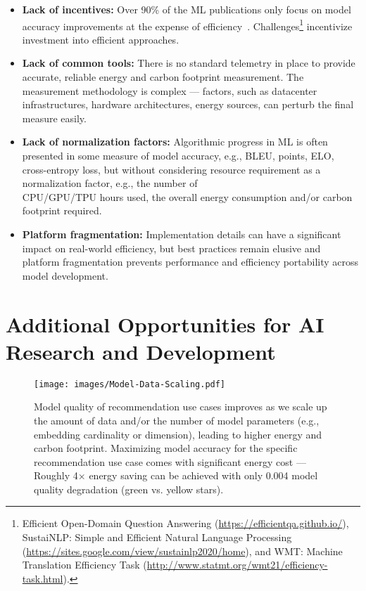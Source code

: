 \documentclass{IEEEtran}
\begin{document}
\begin{itemize}

\setlength\itemsep{0em}
    \item {\bf Lack of incentives:} Over 90\% of the ML publications only focus on model accuracy improvements at the expense of efficiency~\cite{Schwartz:arxiv:2019}. Challenges\footnote{Efficient Open-Domain Question Answering (\url{https://efficientqa.github.io/}), SustaiNLP: Simple and Efficient Natural Language Processing  (\url{https://sites.google.com/view/sustainlp2020/home}), and WMT: Machine Translation Efficiency Task (\url{http://www.statmt.org/wmt21/efficiency-task.html}).} incentivize investment into efficient approaches.
    \item {\bf Lack of common tools:} There is no standard telemetry in place to provide accurate, reliable energy and carbon footprint measurement. The measurement methodology is complex --- factors, such as datacenter infrastructures, hardware architectures, energy sources, can perturb the final measure easily.
    \item {\bf Lack of normalization factors:} Algorithmic progress in ML is often presented in some measure of model accuracy, e.g., BLEU, points, ELO, cross-entropy loss, but without considering resource requirement as a normalization factor, e.g., the number of \\CPU/GPU/TPU hours used, the overall energy consumption and/or carbon footprint required.   
    \item {\bf Platform fragmentation:} Implementation details can have a significant impact on real-world efficiency, but best practices remain elusive and platform fragmentation prevents performance and efficiency portability across model development.

\end{itemize}



\section{Additional Opportunities for AI Research and Development}
\label{sec:additional-opportunities}
\vspace{0.4cm}

\begin{figure}[t]
    \centering
    \texttt{[image: images/Model-Data-Scaling.pdf]}
    \vspace{-1cm}
    \caption{Model quality of recommendation use cases improves as we scale up the amount of data and/or the number of model parameters (e.g., embedding cardinality or dimension), leading to higher energy and carbon footprint. Maximizing model accuracy for the specific recommendation use case comes with significant energy cost --- Roughly 4$\times$ energy saving can be achieved with only 0.004 model quality degradation (green vs. yellow stars).}
    \label{fig:energy-scaling}
    \vspace{-0.4cm}
\end{figure}
\end{document}
